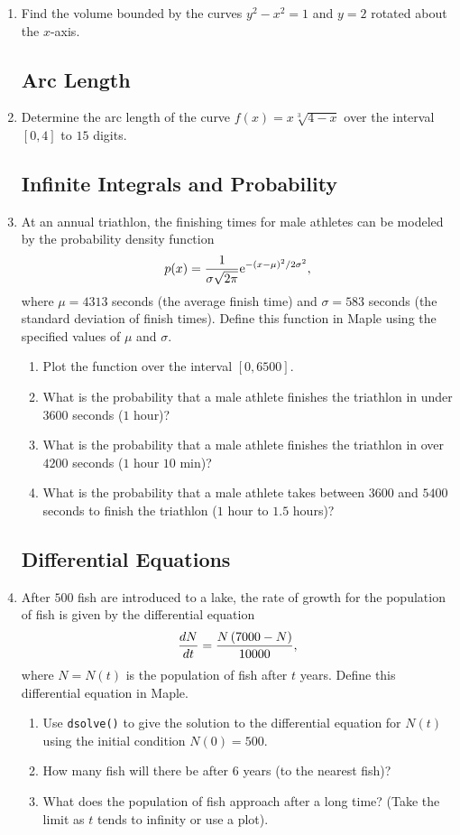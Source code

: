 \begin{enumerate}
\item Find the volume bounded by the curves $y^2 - x^2 = 1$ and $y=2$ rotated about the $x$-axis.

\subsection{Arc Length}

\item Determine the arc length of the curve $f(x) = x\sqrt[3]{4-x}$ over the interval $[0,4]$ to $15$ digits.

\subsection{Infinite Integrals and Probability}

\item At an annual triathlon, the finishing times for male athletes can be modeled by the probability density function
\[ p(x) = \dfrac{1}{\sigma \sqrt{2\pi}} {\rm e}^{-(x-\mu)^2/2\sigma^2}, \]
where $\mu = 4313$ seconds (the average finish time) and $\sigma = 583$ seconds (the standard deviation of finish times). Define this function in Maple using the specified values of $\mu$ and $\sigma$.
	\begin{enumerate}
	\item Plot the function over the interval $[0,6500].$
	\item What is the probability that a male athlete finishes the triathlon in under $3600$ seconds ($1$ hour)?
	\item What is the probability that a male athlete finishes the triathlon in over $4200$ seconds ($1$ hour $10$ min)?
	\item What is the probability that a male athlete takes between $3600$ and $5400$ seconds to finish the triathlon ($1$ hour to $1.5$ hours)?
	\end{enumerate}
	
\subsection{Differential Equations}

\item After $500$ fish are introduced to a lake, the rate of growth for the population of fish is given by the differential equation
\[ \frac{dN}{dt} = \dfrac{N\left(7000 - N\right)}{10000}, \]
where $N=N(t)$ is the population of fish after $t$ years. Define this differential equation in Maple.
	\begin{enumerate}
	\item Use \texttt{dsolve()} to give the solution to the differential equation for $N(t)$ using the initial condition $N(0)=500$.
	\item How many fish will there be after $6$ years (to the nearest fish)?
	\item What does the population of fish approach after a long time? (Take the limit as $t$ tends to infinity or use a plot).
	\end{enumerate}


\end{enumerate}
